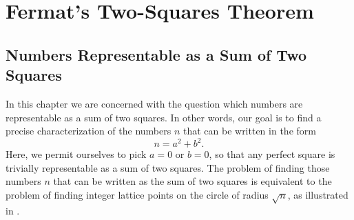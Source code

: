 \chapter{Fermat's Two-Squares Theorem}

\section{Numbers Representable as a Sum of Two Squares}

In this chapter we are concerned with the question which numbers are representable as a sum of two squares. In other words, our goal is to find a precise characterization of the numbers $n$ that can be written in the form
\begin{equation*}
  n=a^2+b^2.
\end{equation*}
Here, we permit ourselves to pick $a=0$ or $b=0$, so that any perfect square is trivially representable as a sum of two squares. The problem of finding those numbers $n$ that can be written as the sum of two squares is equivalent to the problem of finding integer lattice points on the circle of radius $\sqrt{n}$, as illustrated in .

